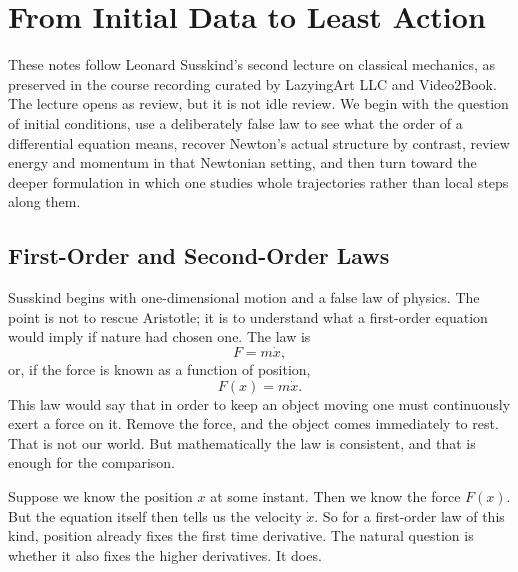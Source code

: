 \chapter{From Initial Data to Least Action}

These notes follow Leonard Susskind's second lecture on classical mechanics, as preserved in the course recording curated by LazyingArt LLC and Video2Book. The lecture opens as review, but it is not idle review. We begin with the question of initial conditions, use a deliberately false law to see what the order of a differential equation means, recover Newton's actual structure by contrast, review energy and momentum in that Newtonian setting, and then turn toward the deeper formulation in which one studies whole trajectories rather than local steps along them.

\section{First-Order and Second-Order Laws}

Susskind begins with one-dimensional motion and a false law of physics. The point is not to rescue Aristotle; it is to understand what a first-order equation would imply if nature had chosen one. The law is
\begin{equation}
F=m\dot x,
\end{equation}
or, if the force is known as a function of position,
\begin{equation}
F(x)=m\dot x.
\end{equation}
This law would say that in order to keep an object moving one must continuously exert a force on it. Remove the force, and the object comes immediately to rest. That is not our world. But mathematically the law is consistent, and that is enough for the comparison.

Suppose we know the position \(x\) at some instant. Then we know the force \(F(x)\). But the equation itself then tells us the velocity \(\dot x\). So for a first-order law of this kind, position already fixes the first time derivative. The natural question is whether it also fixes the higher derivatives. It does.

